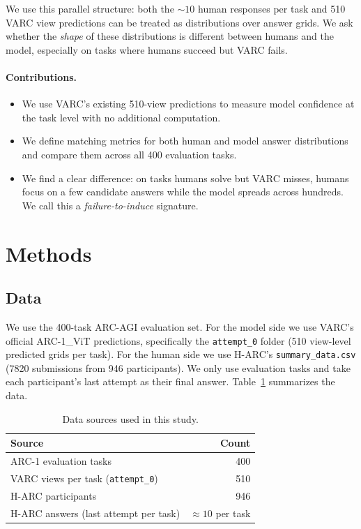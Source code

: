 \documentclass[10pt,letterpaper]{article}
\begin{document}
We use this parallel structure: both the $\sim 10$ human responses per
task and 510 VARC view predictions can be treated as distributions over
answer grids. We ask whether the \emph{shape} of these distributions
is different between humans and the model, especially on tasks where
humans succeed but VARC fails.

\paragraph{Contributions.}
\begin{itemize}
  \item We use VARC's existing 510-view predictions to measure model
        confidence at the task level with no additional computation.
  \item We define matching metrics for both human and model answer
        distributions and compare them across all 400 evaluation tasks.
  \item We find a clear difference: on tasks humans solve but VARC
        misses, humans focus on a few candidate answers while the model
        spreads across hundreds. We call this a
        \emph{failure-to-induce} signature.
\end{itemize}

\section{Methods}

\subsection{Data}

We use the 400-task ARC-AGI evaluation set. For the model side we use
VARC's official ARC-1\_ViT predictions, specifically the
\texttt{attempt\_0} folder (510 view-level predicted grids per task).
For the human side we use H-ARC's \texttt{summary\_data.csv} (7820
submissions from 946 participants). We only use evaluation tasks and
take each participant's last attempt as their final answer.
Table~\ref{tab:data} summarizes the data.

\begin{table}[t]
\centering
\begin{tabular}{lr}
\toprule
\textbf{Source} & \textbf{Count} \\
\midrule
ARC-1 evaluation tasks & 400 \\
VARC views per task (\texttt{attempt\_0}) & 510 \\
H-ARC participants & 946 \\
H-ARC answers (last attempt per task) & $\approx 10$ per task \\
\bottomrule
\end{tabular}
\caption{Data sources used in this study.}
\label{tab:data}
\end{table}
\end{document}
